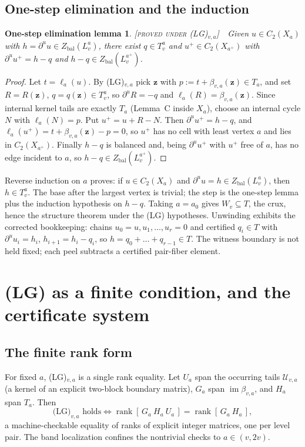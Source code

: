 \documentclass[11pt,reqno]{amsart}
\theoremstyle{plain}
\theoremstyle{definition}
\theoremstyle{plain}
\newtheorem*{onestep}{One-step elimination lemma}
\theoremstyle{definition}
\newcommand{\rank}{\operatorname{rank}}
\newcommand{\Zbal}{Z_{\mathrm{bal}}}
\newcommand{\dbu}{\partial^{u}}
\newcommand{\st}{\textsc}
\begin{document}
\subsection{One-step elimination and the induction}
\begin{onestep}
\textnormal{\st{[proved under (LG)$_{v,a}$]}}\ \ Given $u\in C_2(X_a)$ with
$h=\dbu u\in\Zbal(L_v^a)$, there exist $q\in T_v^a$ and $u^+\in C_2(X_{a^+})$ with
$\dbu u^+=h-q$ and $h-q\in\Zbal(L_v^{a^+})$.
\end{onestep}
\begin{proof}
Let $t=\ell_a(u)$. By (LG)$_{v,a}$ pick $\mathbf z$ with $p:=t+\beta_{v,a}(\mathbf z)\in T_a$,
and set $R=R(\mathbf z)$, $q=q(\mathbf z)\in T_v^a$, so $\dbu R=-q$ and
$\ell_a(R)=\beta_{v,a}(\mathbf z)$. Since internal kernel tails are exactly $T_a$ (Lemma~C inside
$X_a$), choose an internal cycle $N$ with $\ell_a(N)=p$. Put $u^+=u+R-N$. Then $\dbu u^+=h-q$,
and $\ell_a(u^+)=t+\beta_{v,a}(\mathbf z)-p=0$, so $u^+$ has no cell with least vertex $a$ and
lies in $C_2(X_{a^+})$. Finally $h-q$ is balanced and, being $\dbu u^+$ with $u^+$ free of $a$,
has no edge incident to $a$, so $h-q\in\Zbal(L_v^{a^+})$.
\end{proof}
Reverse induction on $a$ proves: if $u\in C_2(X_a)$ and $\dbu u=h\in\Zbal(L_v^a)$, then
$h\in T_v^a$. The base after the largest vertex is trivial; the step is the one-step lemma plus
the induction hypothesis on $h-q$. Taking $a=a_0$ gives $W_v\subseteq T$, the crux, hence the
structure theorem under the (LG) hypotheses. Unwinding exhibits the corrected bookkeeping: chains
$u_0=u,u_1,\dots,u_r=0$ and certified $q_i\in T$ with $\dbu u_i=h_i$, $h_{i+1}=h_i-q_i$, so
$h=q_0+\dots+q_{r-1}\in T$. The witness boundary is not held fixed; each peel subtracts a
certified pair-fiber element.

\section{(LG) as a finite condition, and the certificate system}\label{sec:cert}

\subsection{The finite rank form}
For fixed $a$, (LG)$_{v,a}$ is a single rank equality. Let $U_a$ span the occurring tails
$\mathcal U_{v,a}$ (a kernel of an explicit two-block boundary matrix), $G_a$ span
$\operatorname{im}\beta_{v,a}$, and $H_a$ span $T_a$. Then
\[
\text{(LG)}_{v,a}\text{ holds}\iff\rank[\,G_a\ H_a\ U_a\,]=\rank[\,G_a\ H_a\,],
\]
a machine-checkable equality of ranks of explicit integer matrices, one per level pair. The band
localization confines the nontrivial checks to $a\in(v,2v)$.
\end{document}
